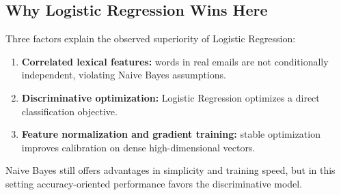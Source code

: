 \subsection{Why Logistic Regression Wins Here}

Three factors explain the observed superiority of Logistic Regression:
\begin{enumerate}
    \item \textbf{Correlated lexical features:} words in real emails are not conditionally independent, violating Naive Bayes assumptions.
    \item \textbf{Discriminative optimization:} Logistic Regression optimizes a direct classification objective.
    \item \textbf{Feature normalization and gradient training:} stable optimization improves calibration on dense high-dimensional vectors.
\end{enumerate}

Naive Bayes still offers advantages in simplicity and training speed, but in this setting accuracy-oriented performance favors the discriminative model.
